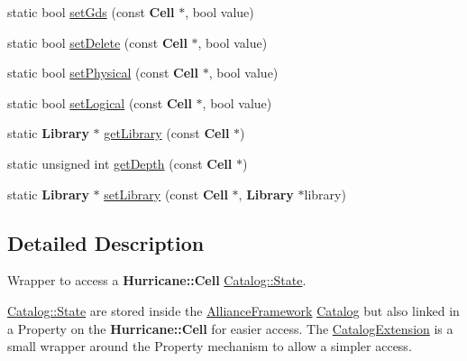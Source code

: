 \begin{DoxyCompactItemize}
\item 
static bool \hyperlink{classCRL_1_1CatalogExtension_a6c440bfd5ac56c9e07213c1347f0610a}{set\-Gds} (const {\bf Cell} $\ast$, bool value)
\item 
static bool \hyperlink{classCRL_1_1CatalogExtension_a8a5bdbfb8c898f8ea00c8718c6714983}{set\-Delete} (const {\bf Cell} $\ast$, bool value)
\item 
static bool \hyperlink{classCRL_1_1CatalogExtension_ae3de9795e0ddce5a767cf53d79fec077}{set\-Physical} (const {\bf Cell} $\ast$, bool value)
\item 
static bool \hyperlink{classCRL_1_1CatalogExtension_a9609c756887f433fe9b250e32ff1ae0a}{set\-Logical} (const {\bf Cell} $\ast$, bool value)
\item 
static {\bf Library} $\ast$ \hyperlink{classCRL_1_1CatalogExtension_a6681f9fbe64998a27fe532fd3591afc7}{get\-Library} (const {\bf Cell} $\ast$)
\item 
static unsigned int \hyperlink{classCRL_1_1CatalogExtension_ae4f8d30cf08796b62422546c05526d86}{get\-Depth} (const {\bf Cell} $\ast$)
\item 
static {\bf Library} $\ast$ \hyperlink{classCRL_1_1CatalogExtension_a6ef1b96f9bbbe39e13a5aba073f2394c}{set\-Library} (const {\bf Cell} $\ast$, {\bf Library} $\ast$library)
\end{DoxyCompactItemize}


\subsection{Detailed Description}
Wrapper to access a {\bf Hurricane\-::\-Cell} \hyperlink{classCRL_1_1Catalog_1_1State}{Catalog\-::\-State}. 

\hyperlink{classCRL_1_1Catalog_1_1State}{Catalog\-::\-State} are stored inside the \hyperlink{classCRL_1_1AllianceFramework}{Alliance\-Framework} \hyperlink{classCRL_1_1Catalog}{Catalog} but also linked in a Property on the {\bf Hurricane\-::\-Cell} for easier access. The \hyperlink{classCRL_1_1CatalogExtension}{Catalog\-Extension} is a small wrapper around the Property mechanism to allow a simpler access. 

